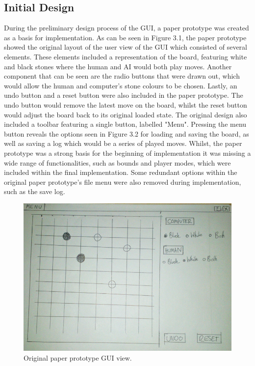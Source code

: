 \documentclass{l3proj}
\begin{document}
\subsection{Initial Design}

During the preliminary design process of the GUI, a paper prototype was created as a basis for implementation. As can be seen in Figure 3.1, the paper prototype showed the original layout of the user view of the GUI which consisted of several elements. These elements included a representation of the board, featuring white and black stones where the human and AI would both play moves. Another component that can be seen are the radio buttons that were drawn out, which would allow the human and computer's stone colours to be chosen. Lastly, an undo button and a reset button were also included in the paper prototype. The undo button would remove the latest move on the board, whilst the reset button would adjust the board back to its original loaded state. The original design also included a toolbar featuring a single button, labelled "Menu".  Pressing the menu button reveals the options seen in Figure 3.2 for loading and saving the board, as well as saving a log which would be a series of played moves. Whilst, the paper prototype was a strong basis for the beginning of implementation it was missing a wide range of functionalities, such as bounds and player modes, which were included within the final implementation. Some redundant options within the original paper prototype's file menu were also removed during implementation, such as the save log.

\begin{figure}[H]
\centering
\includegraphics[scale=0.4]{Images/GUI-1-PP.png}
\caption{Original paper prototype GUI view.}
\end{figure}
\end{document}
